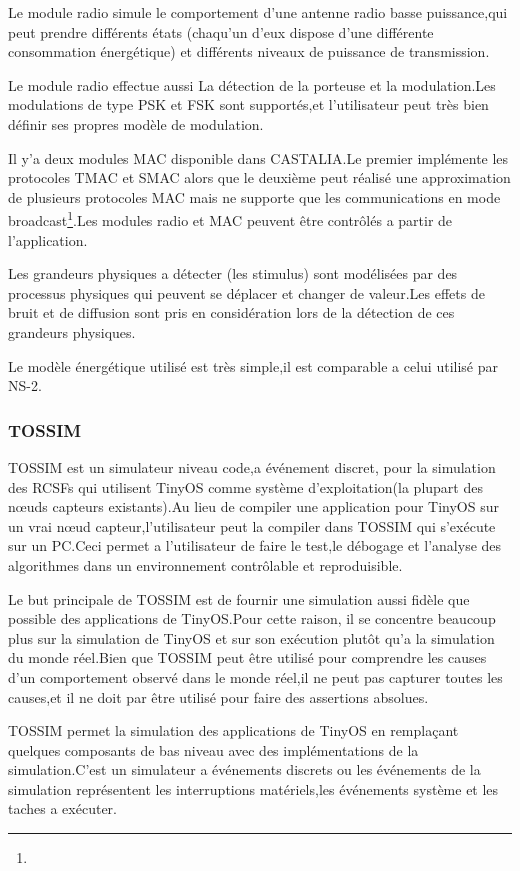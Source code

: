 Le module radio simule le comportement d'une antenne radio basse puissance,qui peut prendre différents états (chaqu'un d'eux dispose d'une différente consommation énergétique) et différents niveaux de puissance de transmission.

Le module radio effectue aussi La détection de la porteuse et la modulation.Les modulations de type PSK et FSK sont supportés,et l'utilisateur peut très bien définir ses propres modèle de modulation.

Il y'a deux modules MAC disponible dans CASTALIA.Le premier implémente les protocoles TMAC et SMAC alors que le deuxième peut réalisé une approximation de plusieurs protocoles MAC mais ne supporte que les communications en mode broadcast\footnote{}.Les modules radio et MAC peuvent être contrôlés a partir de l'application.

Les grandeurs physiques a détecter (les stimulus) sont modélisées par des processus physiques qui peuvent se déplacer et changer de valeur.Les effets de  bruit et de  diffusion sont pris en considération lors de la détection de ces grandeurs physiques.

Le modèle énergétique utilisé est très simple,il est comparable a celui utilisé par NS-2.

\subsubsection{TOSSIM}
TOSSIM est un simulateur niveau code,a événement discret, pour la simulation des RCSFs qui utilisent TinyOS comme système d'exploitation(la plupart des nœuds capteurs existants).Au lieu de compiler une application pour TinyOS sur un vrai nœud capteur,l'utilisateur peut la compiler dans TOSSIM qui s'exécute sur un PC.Ceci permet a l'utilisateur de faire le test,le débogage et l'analyse des algorithmes dans un environnement contrôlable et reproduisible.

Le but principale de TOSSIM est de fournir une simulation aussi fidèle que possible des applications de TinyOS.Pour cette raison, il se concentre beaucoup plus sur la simulation de TinyOS et sur son exécution plutôt qu'a la simulation du monde réel.Bien que TOSSIM peut être utilisé pour comprendre les causes d'un comportement observé dans le monde réel,il ne peut pas capturer toutes les causes,et il ne doit par être utilisé pour faire des assertions absolues.

TOSSIM permet la simulation des applications de TinyOS en remplaçant quelques composants de bas niveau avec des implémentations de la simulation.C'est un simulateur a événements discrets ou les événements de la simulation représentent les interruptions matériels,les événements système et les taches a exécuter.

